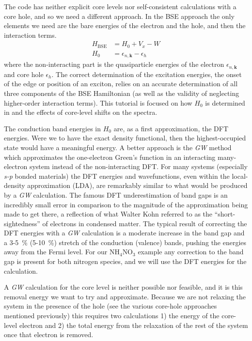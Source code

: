 \documentclass[11pt]{report}
\begin{document}
The  code has neither explicit core levels nor self-consistent calculations with a core hole, and so we need a different approach. In the BSE approach the only elements we need are the bare energies of the electron and the hole, and then the interaction terms. 
\begin{align}
H_\textrm{BSE} &= H_0 + V_x - W \nonumber \\
H_0 &= \epsilon_{n,\mathbf{k}} - \epsilon_h
\end{align}
where the non-interacting part is the quasiparticle energies of the electron $\epsilon_{n,\mathbf{k}}$ and core hole $\epsilon_h$. 
The correct determination of the excitation energies, the onset of the edge or position of an exciton, relies on an accurate determination of all three components of the BSE Hamiltonian (as well as the validity of neglecting higher-order interaction terms). This tutorial is focused on how $H_0$ is determined in  and the effects of core-level shifts on the spectra.

The conduction band energies in $H_0$ are, as a first approximation, the DFT energies. Were we to have the exact density functional, then the highest-occupied state would have a meaningful energy. 
A better approach is the {\it GW} method which approximates the one-electron Green's function in an interacting many-electron system instead of the non-interacting DFT. 
For many systems (especially {\it s-p} bonded materials) the DFT energies and wavefunctions, even within the local-density approximation (LDA), are remarkably similar to what would be produced by a {\it GW} calculation. 
The famous DFT underestimation of band gaps is an incredibly small error in comparison to the magnitude of the approximation being made to get there, a reflection of what Walter Kohn referred to as the ``short-sightedness'' of electrons in condensed matter.
The typical result of correcting the DFT energies with a {\it GW} calculation is a moderate increase in the band gap and a 3-5~\% (5-10~\%) stretch of the conduction (valence) bands, pushing the energies away from the Fermi level. 
For our NH$_4$NO$_3$ example any correction to the band gap is present for both nitrogen species, and we will use the DFT energies for the calculation. 

A {\it GW} calculation for the core level is neither possible nor feasible, and it is this removal energy we want to try and approximate. Because we are not relaxing the system in the presence of the hole (see the various core-hole approaches mentioned previously) this requires two calculations 1) the energy of the core-level electron and 2) the total energy from the relaxation of the rest of the system once that electron is removed. 
\end{document}
